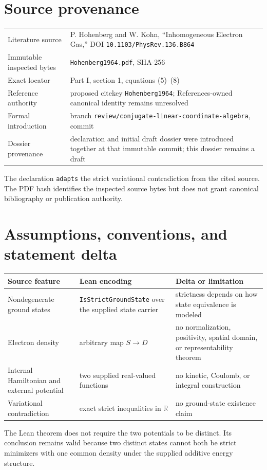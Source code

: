 \section{Source provenance}
\begin{tabularx}{\textwidth}{@{}lY@{}}
\toprule
Literature source & P. Hohenberg and W. Kohn, ``Inhomogeneous Electron Gas,'' DOI \texttt{10.1103/PhysRev.136.B864} \\
Immutable inspected bytes & \texttt{Hohenberg1964.pdf}, SHA-256  \\
Exact locator & Part I, section 1, equations (5)--(8) \\
Reference authority & proposed citekey \texttt{Hohenberg1964}; References-owned canonical identity remains unresolved \\
Formal introduction & branch \texttt{review/conjugate-linear-coordinate-algebra}, commit  \\
Dossier provenance & declaration and initial draft dossier were introduced together at that immutable commit; this dossier remains a draft \\
\bottomrule
\end{tabularx}
The declaration \texttt{adapts} the strict variational contradiction from the cited source.  The
PDF hash identifies the inspected source bytes but does not grant canonical bibliography or
publication authority.

\section{Assumptions, conventions, and statement delta}
\begin{tabularx}{\textwidth}{@{}YYY@{}}
\toprule
Source feature & Lean encoding & Delta or limitation \\
\midrule
Nondegenerate ground states & \texttt{IsStrictGroundState} over the supplied state carrier & strictness depends on how state equivalence is modeled \\
Electron density & arbitrary map \(S\to D\) & no normalization, positivity, spatial domain, or representability theorem \\
Internal Hamiltonian and external potential & two supplied real-valued functions & no kinetic, Coulomb, or integral construction \\
Variational contradiction & exact strict inequalities in \(\mathbb R\) & no ground-state existence claim \\
\bottomrule
\end{tabularx}
The Lean theorem does not require the two potentials to be distinct.  Its conclusion remains valid
because two distinct states cannot both be strict minimizers with one common density under the
supplied additive energy structure.

